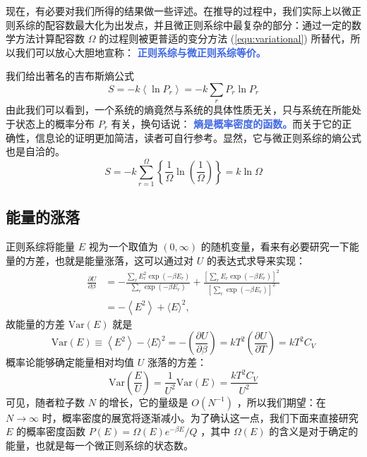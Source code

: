 \documentclass[hyperref,UTF-8]{ctexbook}
\newcommand{\0}{\boldsymbol{0}}
\begin{document}
现在，有必要对我们所得的结果做一些评述。在推导的过程中，我们实际上以微正则系综的配容数最大化为出发点，并且微正则系综中最复杂的部分：通过一定的数学方法计算配容数 $\Omega$ 的过程则被更普适的变分方法 (\ref*{equ:variational}) 所替代，所以我们可以放心大胆地宣称： \textcolor{RoyalBlue}{\textbf{\kaishu  正则系综与微正则系综等价。}}

我们给出著名的吉布斯熵公式
\begin{equation}\label{equ:GibbsS}
    S=-k\left\langle\ln P_r\right\rangle=-k \sum_r P_r \ln P_r
\end{equation}
由此我们可以看到，一个系统的熵竟然与系统的具体性质无关，只与系统在所能处于状态上的概率分布 $P_r$ 有关，换句话说： \textcolor{RoyalBlue}{\textbf{\kaishu 熵是概率密度的函数。}}而关于它的正确性，信息论的证明更加简洁，读者可自行参考。显然，它与微正则系综的熵公式也是自洽的。
\[
    S=-k \sum_{r=1}^{\Omega}\left\{\frac{1}{\Omega} \ln \left(\frac{1}{\Omega}\right)\right\}=k \ln \Omega
\]

\subsection{能量的涨落}

正则系综将能量 $E$ 视为一个取值为 $(0, \infty)$ 的随机变量，看来有必要研究一下能量的方差，也就是能量涨落，这可以通过对 $U$ 的表达式求导来实现：
\[
    \begin{aligned}
\frac{\partial U}{\partial \beta} & =-\frac{\sum_r E_r^2 \exp \left(-\beta E_r\right)}{\sum_r \exp \left(-\beta E_r\right)}+\frac{\left[\sum_r E_r \exp \left(-\beta E_r\right)\right]^2}{\left[\sum_r \exp \left(-\beta E_r\right)\right]^2} \\
& =-\left\langle E^2\right\rangle+\langle E\rangle^2,
\end{aligned}
\]
故能量的方差 $\text{Var}(E)$ 就是
\begin{equation}\label{equ:label}
    \text{Var}(E) \equiv\left\langle E^2\right\rangle-\langle E\rangle^2=-\left(\frac{\partial U}{\partial \beta}\right)=k T^2\left(\frac{\partial U}{\partial T}\right)=k T^2 C_V
\end{equation}
概率论能够确定能量相对均值 $U$ 涨落的方差：
\[
    \text{Var}\left(\frac{E}{U} \right) = \frac{1}{U^2} \text{Var}(E) = \frac{k T^2 C_V}{U^2} 
\]
可见，随者粒子数 $N$ 的增长，它的量级是 $O(N^{-1})$ ，所以我们期望：在 $N \rightarrow \infty$ 时，概率密度的展宽将逐渐减小。为了确认这一点，我们下面来直接研究 $E$ 的概率密度函数 $P(E) = \Omega(E)e^{-\beta E}/Q$ ，其中 $\Omega(E)$ 的含义是对于确定的能量，也就是每一个微正则系综的状态数。
\end{document}
